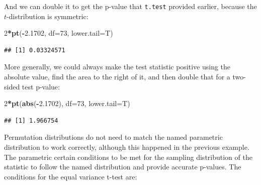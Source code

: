 \documentclass[]{book}
\newenvironment{Shaded}{\begin{snugshade}}{\end{snugshade}}
\newcommand{\KeywordTok}[1]{\textcolor[rgb]{0.13,0.29,0.53}{\textbf{#1}}}
\newcommand{\DataTypeTok}[1]{\textcolor[rgb]{0.13,0.29,0.53}{#1}}
\newcommand{\DecValTok}[1]{\textcolor[rgb]{0.00,0.00,0.81}{#1}}
\newcommand{\FloatTok}[1]{\textcolor[rgb]{0.00,0.00,0.81}{#1}}
\newcommand{\OperatorTok}[1]{\textcolor[rgb]{0.81,0.36,0.00}{\textbf{#1}}}
\newcommand{\NormalTok}[1]{#1}
\theoremstyle{definition}
\theoremstyle{definition}
\theoremstyle{remark}
\begin{document}
And we can double it to get the p-value that \texttt{t.test} provided
earlier, because the \(t\)-distribution is symmetric:

\begin{Shaded}
\begin{Highlighting}[]
\DecValTok{2}\OperatorTok{*}\KeywordTok{pt}\NormalTok{(}\OperatorTok{-}\FloatTok{2.1702}\NormalTok{, }\DataTypeTok{df=}\DecValTok{73}\NormalTok{, }\DataTypeTok{lower.tail=}\NormalTok{T)}
\end{Highlighting}
\end{Shaded}

\begin{verbatim}
## [1] 0.03324571
\end{verbatim}

More generally, we could always make the test statistic positive using
the absolute value, find the area to the right of it, and then double
that for a two-sided test p-value:

\begin{Shaded}
\begin{Highlighting}[]
\DecValTok{2}\OperatorTok{*}\KeywordTok{pt}\NormalTok{(}\KeywordTok{abs}\NormalTok{(}\OperatorTok{-}\FloatTok{2.1702}\NormalTok{), }\DataTypeTok{df=}\DecValTok{73}\NormalTok{, }\DataTypeTok{lower.tail=}\NormalTok{T)}
\end{Highlighting}
\end{Shaded}

\begin{verbatim}
## [1] 1.966754
\end{verbatim}

Permutation distributions do not need to match the named parametric
distribution to work correctly, although this happened in the previous
example. The parametric certain conditions to be met for the sampling
distribution of the statistic to follow the named distribution and
provide accurate p-values. The conditions for the equal variance t-test
are:

\newpage
\end{document}
